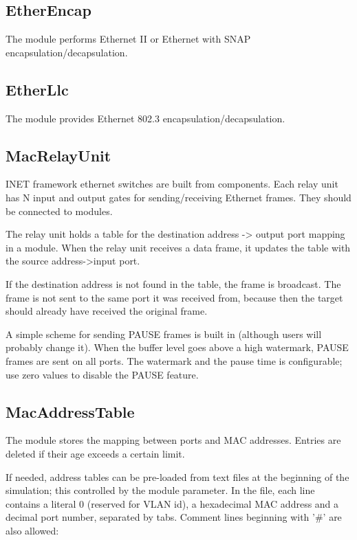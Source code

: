 \subsection{EtherEncap}
\label{sec:ethernet:etherencap}

The  module performs Ethernet II or Ethernet with SNAP
encapsulation/decapsulation.

\subsection{EtherLlc}
\label{sec:ethernet:etherllc}

The  module provides Ethernet 802.3
encapsulation/decapsulation.

\subsection{MacRelayUnit}
\label{sec:ethernet:macrelayunit}

INET framework ethernet switches are built from 
components. Each relay unit has N input and output gates for sending/receiving
Ethernet frames. They should be connected to  modules.

The relay unit holds a table for the destination address -> output port mapping
in a  module.  When the relay unit receives a data frame, it
updates the table with the source address->input port.

If the destination address is not found in the table, the frame is broadcast.
The frame is not sent to the same port it was received from, because then the
target should already have received the original frame.

A simple scheme for sending PAUSE frames is built in (although
users will probably change it). When the buffer level goes
above a high watermark, PAUSE frames are sent on all ports.
The watermark and the pause time is configurable; use zero
values to disable the PAUSE feature.

\subsection{MacAddressTable}
\label{sec:ethernet:macaddresstable}

The  module stores the mapping between ports and MAC addresses.
Entries are deleted if their age exceeds a certain limit.

If needed, address tables can be pre-loaded from text files at the beginning of
the simulation; this controlled by the  module parameter.
In the file, each line contains a literal 0 (reserved for VLAN id), a hexadecimal
MAC address and a decimal port number, separated by tabs. Comment lines
beginning with '\#' are also allowed:

